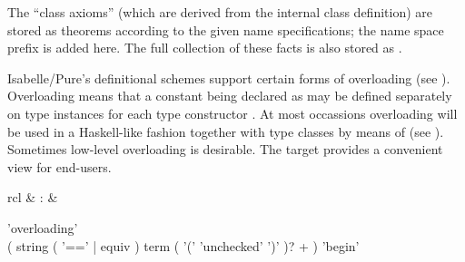 \begin{isabellebody}
\begin{isamarkuptext}
\begin{description}
  The ``class axioms'' (which are derived from the internal class
  definition) are stored as theorems according to the given name
  specifications; the name space prefix  is added
  here.  The full collection of these facts is also stored as .
  
  \end{description}%
\end{isamarkuptext}%
\isamarkuptrue%
%
\isamarkuptrue%
%
\begin{isamarkuptext}%
Isabelle/Pure's definitional schemes support certain forms of
  overloading (see ).  Overloading means that a
  constant being declared as  may be
  defined separately on type instances
  for each type constructor .  At most occassions
  overloading will be used in a Haskell-like fashion together with
  type classes by means of \hyperlink{command.instantiation}{\mbox{}} (see
  ).  Sometimes low-level overloading is desirable.
  The \hyperlink{command.overloading}{\mbox{}} target provides a convenient view for
  end-users.

  \begin{matharray}{rcl}
    \hypertarget{command.overloading}{\hyperlink{command.overloading}{\mbox{}}} & : &  \\
  \end{matharray}

  \begin{rail}
    'overloading' \\
    ( string ( '==' | equiv ) term ( '(' 'unchecked' ')' )? + ) 'begin'
  \end{rail}

  \begin{description}


\end{description}
\end{isamarkuptext}
\end{isabellebody}
